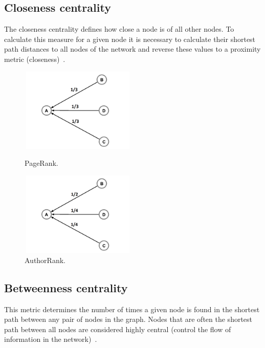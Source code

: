 \documentclass{article}
\begin{document}
\begin{multicols}{2}
\subsection{Closeness centrality}

The closeness centrality defines how close a node is of all other nodes. To calculate this measure for a given node it is necessary to calculate their shortest path distances to all nodes of the network and reverse these values to a proximity metric (closeness)~\cite{liu2005co}.


\begin{figure}[hb]
\begin{minipage}[b]{0.5\linewidth}
\centering
\includegraphics[width=5.5cm,height=4cm]{Figures/pagerank}
\caption{PageRank.}
\label{fig:figure6}
\end{minipage}
\hspace{0.5cm}
\begin{minipage}[b]{0.4\linewidth}
\centering
\includegraphics[width=5.5cm,height=4cm]{Figures/authorrank}
\caption{AuthorRank.}
\label{fig:figure7}
\end{minipage}
\end{figure}


\subsection{Betweenness centrality}

This metric determines the number of times a given node is found in the shortest path between any pair of nodes in the graph. Nodes that are often the shortest path between all nodes are considered highly central (control the flow of information in the network)~\cite{liu2005co}.


\end{multicols}
\end{document}
